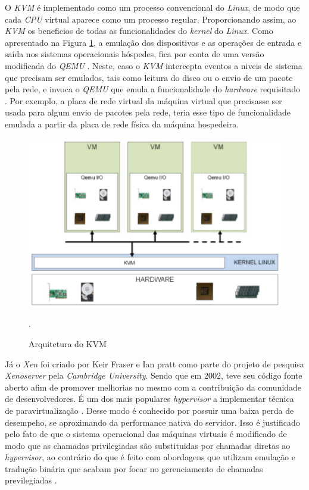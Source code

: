 O \textit{KVM} é implementado como um processo convencional do \textit{Linux}, de modo que cada \textit{CPU} virtual aparece como um processo regular. Proporcionando assim, ao \textit{KVM} os beneficios de todas as funcionalidades do \textit{kernel} do \textit{Linux}\cite{redhatkvm}. Como apresentado na Figura \ref{kvm_arc}, a emulação dos dispositivos e as operações de entrada e saída nos sistemas operacionais hóspedes, fica por conta de uma versão modificada do \textit{QEMU} \cite{redhatkvm,qumranet}. Neste, caso o \textit{KVM} intercepta eventos a niveis de sistema que precisam ser emulados, tais como leitura do disco ou o envio de um pacote pela rede, e invoca o \textit{QEMU} que emula a funcionalidade do \textit{hardware} requisitado \cite{rasmusson}. Por exemplo, a placa de rede virtual da máquina virtual que precisasse ser usada para algum envio de pacotes pela rede, teria esse tipo de funcionalidade emulada a partir da placa de rede física da máquina hospedeira. 

\begin{figure}[!htb]
\centering
\includegraphics [keepaspectratio=true,scale=0.6]{figuras/kvm_arc.eps}
\caption{Arquitetura do KVM}
\cite{fabiano}.
\label{kvm_arc}
\end{figure}

Já o \textit{Xen} foi criado por Keir Fraser e Ian pratt como parte do projeto de pesquisa \textit{Xenoserver} pela \textit{Cambridge University}. Sendo que em 2002, teve seu código fonte aberto afim de promover melhorias no mesmo com a contribuição da comunidade de desenvolvedores. É um dos mais populares \textit{hypervisor} a implementar técnica de paravirtualização \cite{xen}. Desse modo é conhecido por possuir uma baixa perda de desempeho, se aproximando da performance nativa do servidor\cite{walters}. Isso é justificado pelo fato de que o sistema operacional das máquinas virtuais é modificado de modo que as chamadas privilegiadas são substituidas por chamadas diretas ao \textit{hypervisor}, ao contrário do que é feito com abordagens que utilizam emulação e tradução binária que acabam por focar no gerenciamento de chamadas previlegiadas \cite{redhatkvm}. 

